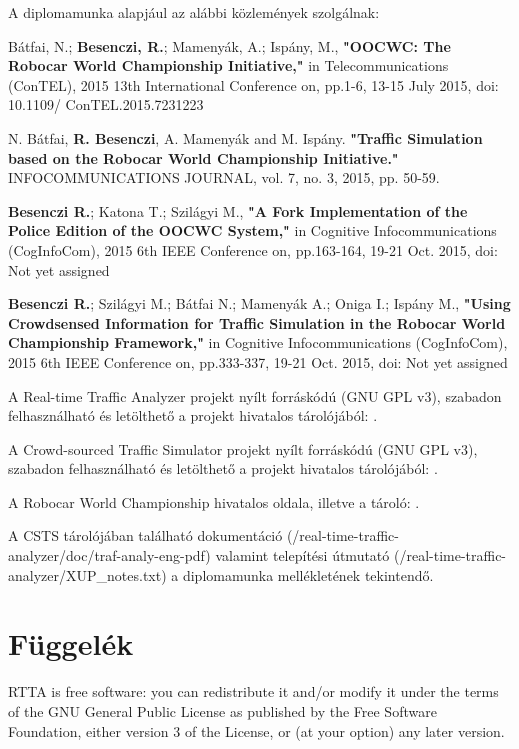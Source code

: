 \documentclass[a4paper,12pt]{report}
\begin{document}
\noindent
A diplomamunka alapjául az alábbi közlemények szolgálnak:

\noindent
Bátfai, N.; {\bf{Besenczi, R.}}; Mamenyák, A.; Ispány, M., {\bf{"OOCWC: The Robocar World Championship Initiative,"}} in Telecommunications (ConTEL), 2015 13th International Conference on, pp.1-6, 13-15 July 2015, doi: 10.1109/ ConTEL.2015.7231223

\noindent
N. Bátfai, {\bf{R. Besenczi}}, A. Mamenyák and M. Ispány. {\bf{"Traffic Simulation based on the Robocar World Championship Initiative."}} INFOCOMMUNICATIONS JOURNAL, vol. 7, no. 3, 2015, pp. 50-59.

\noindent
{\bf{Besenczi R.}}; Katona T.; Szilágyi M., {\bf{"A Fork Implementation of the Police Edition of the OOCWC System,"}} in Cognitive Infocommunications (CogInfoCom), 2015 6th IEEE Conference on, pp.163-164, 19-21 Oct. 2015, doi: Not yet assigned

\noindent
{\bf{Besenczi R.}}; Szilágyi M.; Bátfai N.; Mamenyák A.; Oniga I.; Ispány M., {\bf{"Using Crowdsensed Information for Traffic Simulation in the Robocar World Championship Framework,"}} in Cognitive Infocommunications (CogInfoCom), 2015 6th IEEE Conference on, pp.333-337, 19-21 Oct. 2015, doi: Not yet assigned

\noindent
A Real-time Traffic Analyzer projekt nyílt forráskódú (GNU GPL v3), szabadon felhasználható és letölthető a projekt hivatalos tárolójából: \cite{rtta}.

\noindent
A Crowd-sourced Traffic Simulator projekt nyílt forráskódú (GNU GPL v3), szabadon felhasználható és letölthető a projekt hivatalos tárolójából: \cite{csts}.

\noindent
A Robocar World Championship hivatalos oldala, illetve a tároló: \cite{oocwcrepo}.

\noindent
A CSTS tárolójában található dokumentáció (\cite{csts}/real-time-traffic-analyzer/doc/traf-analy-eng-pdf) valamint telepítési útmutató (\cite{csts}/real-time-traffic-analyzer/XUP\_notes.txt) a diplomamunka mellékletének tekintendő.


\chapter*{Függelék}

\noindent
RTTA is free software: you can redistribute it and/or modify
it under the terms of the GNU General Public License as published by
the Free Software Foundation, either version 3 of the License, or
(at your option) any later version.
\end{document}
